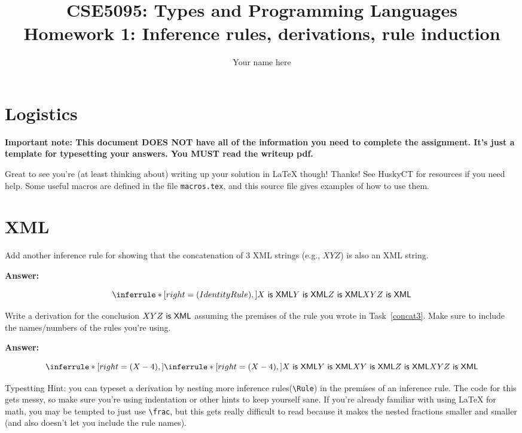 \documentclass{article}
\title{CSE5095: Types and Programming Languages\\
  {\large Homework 1: Inference rules, derivations, rule induction}}
\author{Your name here}
\begin{document}
\maketitle

\section{Logistics}
\textbf{Important note: This document DOES NOT have all of the information
  you need to complete the assignment. It's just a template for typesetting
  your answers. You MUST read the writeup pdf.}

Great to see you're (at least thinking about) writing up your solution in
LaTeX though! Thanks! See HuskyCT for resources if you need help.
Some useful macros are defined in the file \texttt{macros.tex}, and
this source file gives examples of how to use them.

\section{XML}

\begin{task}\label{concat3}
Add another inference rule for showing that the concatenation of
3 XML strings (e.g., $XYZ$) is also an XML string.
\end{task}

\textbf{Answer:}

\[
\Rule{IdentityRule}
     {\isxml{X}\\
       \isxml{Y}\\
       \isxml{Z}}
     {\isxml{XYZ}}
\]

\begin{task}
  Write a derivation for the conclusion
  $XYZ~\mathsf{is~XML}$ assuming the premises of the rule you wrote in
  Task~\ref{concat3}.
    Make sure to include the names/numbers of the rules you're using.
\end{task}

\textbf{Answer:}

\[
\Rule{X-4}
     {\Rule{X-4}
           {\isxml{X}\\
             \isxml{Y}}
           {\isxml{XY}}\\
       \isxml{Z}}
     {\isxml{XYZ}}
\]

Typestting Hint: you can typeset a derivation by nesting more
inference rules(\texttt{\textbackslash Rule}) in the premises of an
inference rule. The code for this gets messy, so make sure you're using
indentation or other hints to keep yourself sane.
If you're already familiar with using LaTeX for math, you may be tempted to
just use \texttt{\textbackslash frac}, but this gets really difficult to
read because it makes the nested fractions smaller and smaller (and also
doesn't let you include the rule names).
\end{document}
